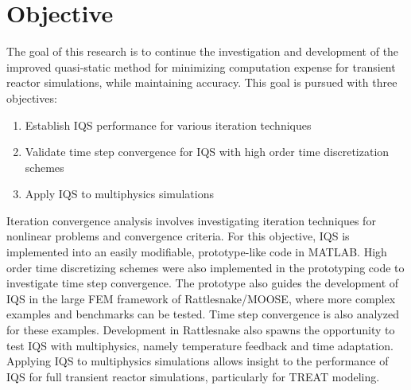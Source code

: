 \section{Objective}

The goal of this research is to continue the investigation and development of the improved quasi-static method for minimizing computation expense for transient reactor simulations, while maintaining accuracy. This goal is pursued with three objectives:

\begin{enumerate}
\item Establish IQS performance for various iteration techniques
\item Validate time step convergence for IQS with high order time discretization schemes
\item Apply IQS to multiphysics simulations
\end{enumerate}

Iteration convergence analysis involves investigating iteration techniques for nonlinear problems and convergence criteria. For this objective, IQS is implemented into an easily modifiable, prototype-like code in MATLAB. High order time discretizing schemes were also implemented in the prototyping code to investigate time step convergence. The prototype also guides the development of IQS in the large FEM framework of Rattlesnake/MOOSE, where more complex examples and benchmarks can be tested.  Time step convergence is also analyzed for these examples. Development in Rattlesnake also spawns the opportunity to test IQS with multiphysics, namely temperature feedback and time adaptation. Applying IQS to multiphysics simulations allows insight to the performance of IQS for full transient reactor simulations, particularly for TREAT modeling.


